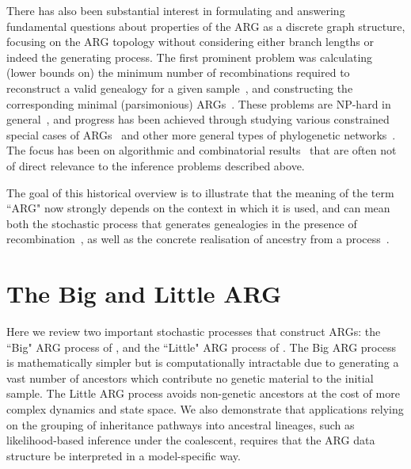 \documentclass[9pt,twocolumn,twoside]{gsajnl}
\begin{document}
There has also been substantial interest in formulating and answering
fundamental questions about properties
of the ARG as a discrete graph structure, focusing on the ARG topology without considering
either branch lengths or indeed the generating process.
The first prominent problem was calculating (lower bounds on) the minimum number of
recombinations required to reconstruct a valid genealogy for a given
sample~\citep{myers2003bounds}, and constructing the corresponding
minimal (parsimonious)
ARGs~\citep{song2003parsimonious,song2005efficient,lyngso2005minimum}.
These problems are NP-hard in general~\citep{wang2001perfect}, and progress has
been achieved through studying various constrained special cases of ARGs~\citep[e.g.][]{gusfield2004optimal} and
other more general types of phylogenetic networks~\citep{huson2010phylogenetic}. The
focus has been on algorithmic and combinatorial results~\citep{gusfield2014recombinatorics}
that are often not of
direct relevance to the inference problems described above.

The goal of this historical overview is to illustrate that the meaning of the term ``ARG" now strongly
depends on the context in which it is used, and can mean both the
stochastic process that generates genealogies in the presence of
recombination~\citep[e.g.][]{nordborg2000linkage,birkner2013ancestral,
wilton2015smc,griffiths2016coalescent},
as well as the concrete realisation of ancestry from a
process~\citep[e.g.][]{gusfield2014recombinatorics,mathieson2020ancestry,brandt2021evaluation}.

\section{The Big and Little ARG}
\label{sec-big-and-little-arg}
Here we review two important stochastic processes that construct ARGs:
the ``Big" ARG process of \cite{griffiths1997ancestral}, and the ``Little" ARG process of
 \cite{hudson1983properties}. The Big ARG process is mathematically simpler
 but is computationally intractable due to generating a vast number of ancestors
 which contribute no genetic material to the initial sample.
The Little ARG process avoids non-genetic ancestors at the cost of more complex
dynamics and state space. We also demonstrate that applications relying on the grouping of inheritance pathways into ancestral lineages, such as likelihood-based inference under the coalescent, requires that the
ARG data structure be interpreted in a model-specific way.
\end{document}
